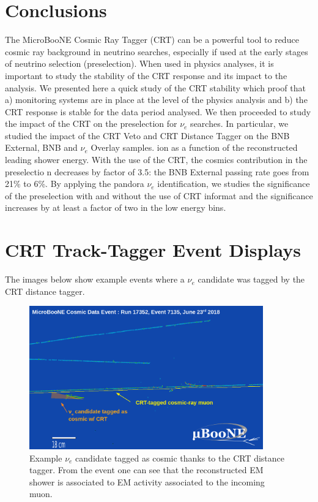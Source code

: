 \section{Conclusions}\label{sec:Conclusions}
The MicroBooNE Cosmic Ray Tagger  (CRT) can be a powerful tool to reduce cosmic ray background in neutrino searches, especially if used at the early stages of neutrino selection (preselection). When used in physics analyses, it is important to study the stability of the CRT response and its impact to the analysis. We presented here a quick study of the CRT stability which proof that a) monitoring systems are in place at the level of the physics analysis and b) the CRT response is stable for the data period analysed.
We then proceeded to study the impact of the CRT on the preselection for $\nu_e$ searches. In particular, we studied the impact of the CRT Veto and CRT Distance Tagger on the BNB External, BNB and $\nu_e$ Overlay samples. ion as a function of the reconstructed leading shower energy. With the use of the CRT, the cosmics contribution in the preselectio
n decreases by factor of 3.5: the BNB External passing rate goes from 21\% to 6\%. By applying the pandora $\nu_e$ identification, we studies the significance of the preselection with and without the use of CRT informat and the significance increases by at least a factor of two in the low energy bins.

\newpage

\appendix

\section{CRT Track-Tagger Event Displays}

The images below show example events where a $\nu_e$ candidate was tagged by the CRT distance tagger.

\begin{figure}[h!]
\centering
\includegraphics[width=0.9\textwidth]{images/crttagger_00.png}
\caption{Example $\nu_e$ candidate tagged as cosmic thanks to the CRT distance tagger. From the event one can see that the reconstructed EM shower is associated to EM activity associated to the incoming muon.}
\label{fig:crtdist00}
\end{figure}


